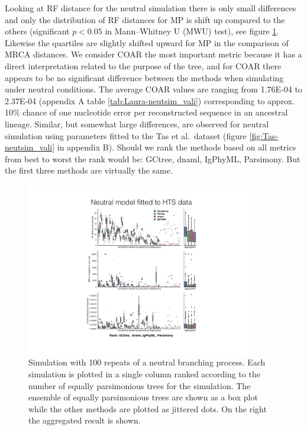 Looking at RF distance for the neutral simulation there is only small differences and only the distribution of RF distances for MP is shift up compared to the others (significant $p<0.05$ in Mann–Whitney U (MWU) test), see figure \ref{fig:Laura-neutsim_valid}.
Likewise the quartiles are slightly shifted upward for MP in the comparison of MRCA distances.
We consider COAR the most important metric because it has a direct interpretation related to the purpose of the tree, and for COAR there appears to be no significant difference between the methods when simulating under neutral conditions.
The average COAR values are ranging from 1.76E-04 to 2.37E-04 (appendix A table \ref{tab:Laura-neutsim_vali}) corresponding to approx. 10\% chance of one nucleotide error per reconstructed sequence in an ancestral lineage.
Similar, but somewhat large differences, are observed for neutral simulation using parameters fitted to the Tas et al.\ dataset (figure \ref{fig:Tas-neutsim_vali} in appendix B).
Should we rank the methods based on all metrics from best to worst the rank would be: GCtree, dnaml, IgPhyML, Parsimony.
But the first three methods are virtually the same.

\begin{figure}[!ht]
    \centering
    \includegraphics[width=0.9\textwidth]{figures/Laura-neutsim_valid.pdf}
    \caption{
        \label{fig:Laura-neutsim_valid}
        Simulation with 100 repeats of a neutral branching process.
        Each simulation is plotted in a single column ranked according to the number of equally parsimonious trees for the simulation.
        The ensemble of equally parsimonious trees are shown as a box plot while the other methods are plotted as jittered dots.
        On the right the aggregated result is shown.
    }
\end{figure}
\clearpage


